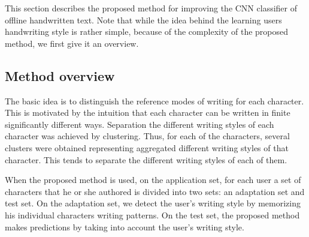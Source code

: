 \documentclass{article}
\begin{document}
This section describes the proposed method for improving the CNN classifier of offline handwritten text.
Note that while the idea behind the learning users handwriting style is rather simple, because of the complexity of the proposed method, we first give it an overview.

\subsection{Method overview}

The basic idea is to distinguish the reference modes %
of writing for each character.
This is motivated by the intuition that each character can be written in finite significantly different ways.
Separation the different writing styles of each character was achieved by clustering.
Thus, for each of the characters, several clusters were obtained representing aggregated different writing styles of that character.
This tends to separate the different writing styles of each of them.

When the proposed method is used, on the application set, for each user a set of characters that he or she authored is divided into two sets: an adaptation set and test set.
On the adaptation set, we detect the user's writing style by memorizing his individual characters writing patterns.
On the test set, the proposed method makes predictions by taking into account the user's writing style.
\end{document}
